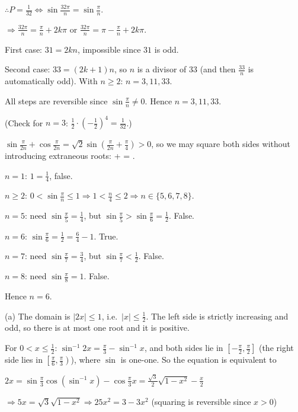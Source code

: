   $\therefore P = \frac{1}{32}\Leftrightarrow\sin\frac{32\pi}{n} = \sin\frac{\pi}{n}$.

  $\Rightarrow\frac{32\pi}{n} = \frac{\pi}{n} + 2k\pi$ or $\frac{32\pi}{n} = \pi - \frac{\pi}{n} + 2k\pi$.

  First case: $31 = 2kn$, impossible since $31$ is odd.

  Second case: $33 = (2k + 1)n$, so $n$ is a divisor of $33$ (and then $\frac{33}{n}$ is automatically odd). With
  $n\ge 2$: $n = 3, 11, 33$.

  All steps are reversible since $\sin\frac{\pi}{n}\neq 0$. Hence $n = 3, 11, 33$.

  (Check for $n = 3$: $\frac{1}{2}\cdot\left(-\frac{1}{2}\right)^4 = \frac{1}{32}$.)
\item $\sin\frac{\pi}{2n} + \cos\frac{\pi}{2n} = \sqrt{2}\sin\left(\frac{\pi}{2n} + \frac{\pi}{4}\right) > 0$, so we
  may square both sides without introducing extraneous roots:
   + \sin{} = .
  \stopformula

  $n = 1$: $1 = \frac{1}{4}$, false.

  $n\ge 2$: $0 < \sin\frac{\pi}{n}\le 1\Rightarrow 1 < \frac{n}{4}\le 2\Rightarrow n\in\{5, 6, 7, 8\}$.

  $n = 5$: need $\sin\frac{\pi}{5} = \frac{1}{4}$, but $\sin\frac{\pi}{5} > \sin\frac{\pi}{6} = \frac{1}{2}$. False.

  $n = 6$: $\sin\frac{\pi}{6} = \frac{1}{2} = \frac{6}{4} - 1$. True.

  $n = 7$: need $\sin\frac{\pi}{7} = \frac{3}{4}$, but $\sin\frac{\pi}{7} < \frac{1}{2}$. False.

  $n = 8$: need $\sin\frac{\pi}{8} = 1$. False.

  Hence $n = 6$.
\item (a) The domain is $|2x|\le 1$, i.e.\ $|x|\le\frac{1}{2}$. The left side is strictly increasing and odd, so
  there is at most one root and it is positive.

  For $0 < x\le\frac{1}{2}$: $\sin^{-1}2x = \frac{\pi}{3} - \sin^{-1}x$, and both sides lie in $\left[-\frac{\pi}{2},
  \frac{\pi}{2}\right]$ (the right side lies in $\left[\frac{\pi}{6}, \frac{\pi}{3}\right)$), where $\sin$ is one-one.
  So the equation is equivalent to

  $2x = \sin\frac{\pi}{3}\cos\left(\sin^{-1}x\right) - \cos\frac{\pi}{3}x = \frac{\sqrt{3}}{2}\sqrt{1 - x^2} -
  \frac{x}{2}$

  $\Rightarrow 5x = \sqrt{3}\sqrt{1 - x^2}\Rightarrow 25x^2 = 3 - 3x^2$ (squaring is reversible since $x > 0$)

